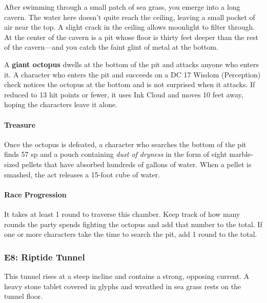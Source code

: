 \documentclass[letterpaper, 11pt, bg=full, twocolumn]{dndbook}
\begin{document}
\begin{DndReadAloud}
After swimming through a small patch of sea grass, you emerge into a long cavern. The water here doesn't quite reach the ceiling, leaving a small pocket of air near the top. A slight crack in the ceiling allows moonlight to filter through. At the center of the cavern is a pit whose floor is thirty feet deeper than the rest of the cavern---and you catch the faint glint of metal at the bottom.
\end{DndReadAloud}

A \textbf{giant octopus} dwells at the bottom of the pit and attacks anyone who enters it. A character who enters the pit and succeeds on a DC 17 Wisdom (Perception) check notices the octopus at the bottom and is not surprised when it attacks. If reduced to 13 hit points or fewer, it uses Ink Cloud and moves 10 feet away, hoping the characters leave it alone.

\paragraph{Treasure}

Once the octopus is defeated, a character who searches the bottom of the pit finds 57 sp and a pouch containing \textit{dust of dryness} in the form of eight marble-sized pellets that have absorbed hundreds of gallons of water. When a pellet is smashed, the act releases a 15-foot cube of water.

\paragraph{Race Progression}

It takes at least 1 round to traverse this chamber. Keep track of how many rounds the party spends fighting the octopus and add that number to the total. If one or more characters take the time to search the pit, add 1 round to the total.


\subsubsection{E8: Riptide Tunnel}

\begin{DndReadAloud}
This tunnel rises at a steep incline and contains a strong, opposing current. A heavy stone tablet covered in glyphs and wreathed in sea grass rests on the tunnel floor.
\end{DndReadAloud}
\end{document}
